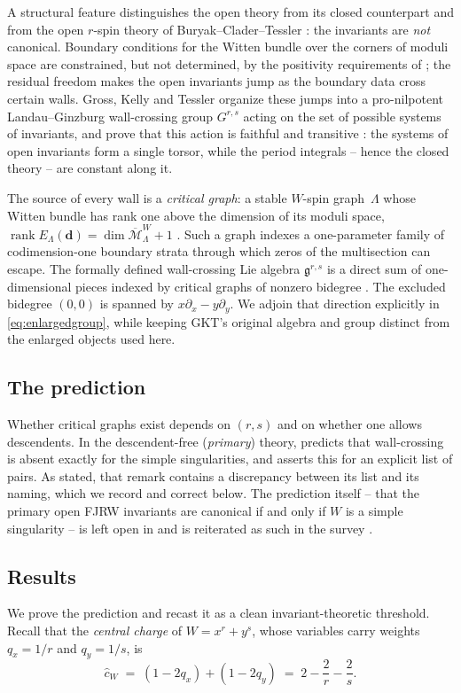 \documentclass[11pt]{amsart}
\theoremstyle{definition}
\theoremstyle{remark}
\newcommand{\rank}{\operatorname{rank}}
\newcommand{\Mbar}{\overline{\mathcal{M}}}
\newcommand{\gfrak}{\mathfrak{g}}
\newcommand{\chat}{\hat{c}}
\begin{document}
A structural feature distinguishes the open theory from its closed counterpart
and from the open $r$-spin theory of Buryak--Clader--Tessler
\cite{BCT21,BCT18}: the invariants are \emph{not} canonical. Boundary conditions
for the Witten bundle over the corners of moduli space are constrained, but not
determined, by the positivity requirements of \cite{GKT}; the residual freedom
makes the open invariants jump as the boundary data cross certain walls. Gross,
Kelly and Tessler organize these jumps into a pro-nilpotent Landau--Ginzburg
wall-crossing group $G^{r,s}$ acting on the set of possible systems of
invariants, and prove that this action is faithful and transitive
\cite[Theorems~0.7 and~4.27]{GKT}: the systems of open invariants form a single
torsor, while the period integrals -- hence the closed theory -- are constant
along it.

The source of every wall is a \emph{critical graph}: a stable $W$-spin
graph~$\Lambda$ whose Witten bundle has rank one above the dimension of its
moduli space, $\rank E_{\Lambda}(\mathbf d)=\dim\Mbar^{W}_{\Lambda}+1$
\cite[Definition~2.33]{GKT}. Such a graph indexes a one-parameter family of
codimension-one boundary strata through which zeros of the multisection can
escape. The formally defined wall-crossing Lie algebra $\gfrak^{r,s}$ is a
direct sum of one-dimensional pieces indexed by critical graphs of nonzero
bidegree \cite[Definition~4.23]{GKT}. The excluded bidegree $(0,0)$ is spanned
by $x\partial_x-y\partial_y$.  We adjoin that direction explicitly in
\eqref{eq:enlargedgroup}, while keeping GKT's original algebra and group
distinct from the enlarged objects used here.

\subsection*{The prediction}
Whether critical graphs exist depends on $(r,s)$ and on whether one allows
descendents. In the descendent-free (\emph{primary}) theory,
\cite[Remark~0.9]{GKT} predicts that wall-crossing is absent exactly for the
simple singularities, and asserts this for an explicit list of pairs. As stated,
that remark contains a discrepancy between its list and its naming, which we
record and correct below. The prediction itself -- that the primary open FJRW
invariants are canonical if and only if $W$ is a simple singularity -- is left
open in \cite{GKT} and is reiterated as such in the survey \cite{GKTsurvey}.

\subsection*{Results}
We prove the prediction and recast it as a clean invariant-theoretic threshold.
Recall that the \emph{central charge} of $W=x^{r}+y^{s}$, whose variables carry
weights $q_{x}=1/r$ and $q_{y}=1/s$, is
\begin{equation}
\label{eq:centralcharge}
\chat_{W}\;=\;(1-2q_{x})+(1-2q_{y})\;=\;2-\frac{2}{r}-\frac{2}{s}.
\end{equation}
\end{document}
